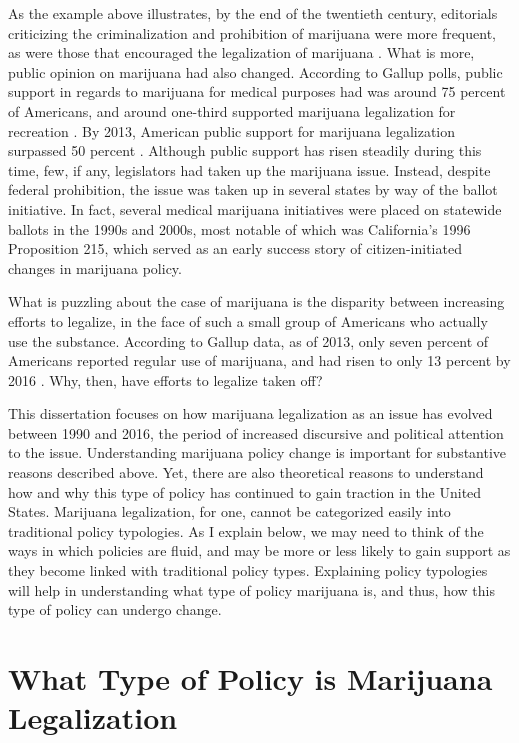 As the example above illustrates, by the end of the twentieth century, editorials criticizing the criminalization and prohibition of marijuana were more frequent, as were those that encouraged the legalization of marijuana  \citep{mosher_and_akins_2019}. %
What is more, public opinion on marijuana had also changed. According to Gallup polls, public support in regards to marijuana for medical purposes had was around 75 percent of Americans, and around one-third supported marijuana legalization for recreation \citep{gallup_2001,gallup_2003}. By 2013, American public support for marijuana legalization surpassed 50 percent \citep{gallup_2013}. Although public support has risen steadily during this time, few, if any, legislators had taken up the marijuana issue. Instead, despite federal prohibition, the issue was taken up in several states by way of the ballot initiative. In fact, several medical marijuana initiatives were placed on statewide ballots in the 1990s and 2000s, most notable of which was California's 1996 Proposition 215, which served as an early success story of citizen-initiated changes in marijuana policy.

What is puzzling about the case of marijuana is the disparity between increasing efforts to legalize, in the face of such a small group of Americans who actually use the substance. According to Gallup data, as of 2013, only seven percent of Americans reported regular use of marijuana, and had risen to only 13 percent by 2016 \citep{gallup_2016}. Why, then, have efforts to legalize taken off?

This dissertation focuses on how marijuana legalization as an issue has evolved between 1990 and 2016, the period of increased discursive and political attention to the issue. Understanding marijuana policy change is important for substantive reasons described above. Yet, there are also theoretical reasons to understand how and why this type of policy has continued to gain traction in the United States. Marijuana legalization, for one, cannot be categorized easily into traditional policy typologies. As I explain below, we may need to think of the ways in which policies are fluid, and may be more or less likely to gain support as they become linked with traditional policy types. Explaining policy typologies will help in understanding what type of policy marijuana is, and thus, how this type of policy can undergo change. 


\section{What Type of Policy is Marijuana Legalization}

